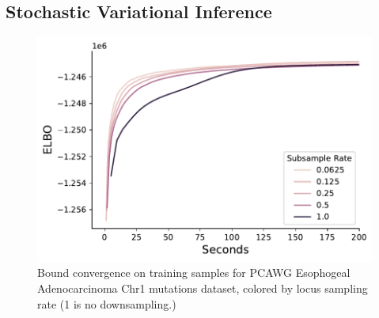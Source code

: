 \documentclass{article}
\begin{document}
\subsection{Stochastic Variational Inference}


\begin{figure}[h]
\caption{Bound convergence on training samples for PCAWG Esophogeal Adenocarcinoma Chr1 mutations dataset, colored by locus sampling rate (1 is no downsampling.)}
\centering
\includegraphics[scale=0.65]{svi_subsampling.pdf}
\end{figure}
\end{document}
